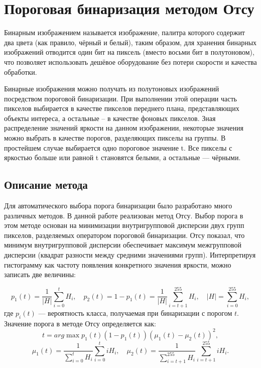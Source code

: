 \documentclass[12pt,a4paper]{extarticle} %
\begin{document}

\newpage
\tableofcontents
\newpage

\section{Пороговая бинаризация методом Отсу}

Бинарным изображением называется изображение, палитра которого содержит два цвета (как правило, чёрный и белый), таким образом, для хранения бинарных изображений отводится один бит на пиксель (вместо восьми бит в полутоновом), что позволяет использовать дешёвое оборудование без потери скорости и качества обработки.

    Бинарные изображения можно получать из полутоновых изображений посредством пороговой бинаризации. При выполнении этой операции часть пикселов выбирается в качестве пикселов переднего плана, представляющих объекты интереса, а остальные – в качестве фоновых пикселов. Зная распределение значений яркости на данном изображении, некоторые значения можно выбрать в качестве порогов, разделяющих пикселы на группы. В простейшем случае выбирается одно пороговое значение t. Все пикселы с яркостью больше или равной t становятся белыми, а остальные --- чёрными.\


\subsection{Описание метода}

    Для автоматического выбора порога бинаризации было разработано много различных методов. В данной работе реализован метод Отсу. Выбор порога в этом методе основан на минимизации внутригрупповой дисперсии двух групп пикселов, разделяемых оператором пороговой бинаризации. Отсу показал, что минимум внутригрупповой дисперсии обеспечивает максимум межгрупповой дисперсии (квадрат разности между средними значениями групп).
Интерпретируя гистограмму как частоту появления конкретного значения яркости, можно записать две величины:

\begin{equation*}
    p_1(t) = \frac{1}{| H |} \sum\limits_{i=0}^{t} H_i, \quad p_2(t)=1 - p_1(t) =  \frac{1}{| H |} \sum\limits_{i=t+1}^{255} H_i, \quad |H| = \sum\limits_{i=0}^{255} H_i,
\end{equation*}
где $p_i(t)$ --- вероятность класса, получаемая при бинаризации с порогом $t$. Значение порога в методе Отсу определяется как:
\begin{equation*}
    t= arg\max p_1(t)(1 - p_1(t))(\mu_1(t) - \mu_2(t))^2,
\end{equation*}
\begin{equation*}
     \mu_1(t) = \frac{1}{\sum\limits_{i=0}^t H_i} \sum\limits_{i=0}^t i H_i, \quad \mu_2(t) = \frac{1}{\sum\limits_{i=t+1}^{255} H_i} \sum\limits_{i=t+1}^{255} i H_i.
\end{equation*}
\end{document}
